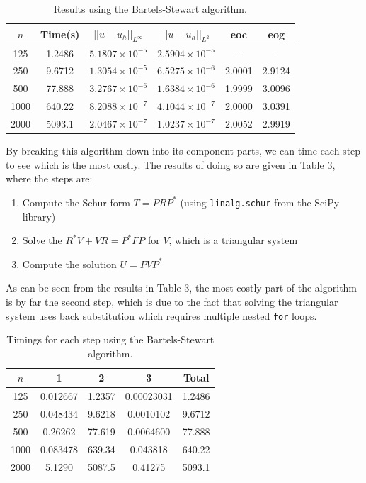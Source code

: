 \documentclass{article}
\numberwithin{equation}{section}
\begin{document}
\begin{table}[H]
\centering
\begin{tabular}{|c|c|c|c|c|c|}
\hline
$n$ & Time(s) & $|| u - u_h ||_{L^{\infty}}$ &$|| u - u_h ||_{L^{2}}$ & eoc & eog \\
\hline
125 & 1.2486 & $5.1807 \times 10^{-5}$ & $2.5904 \times 10^{-5}$ & - & - \\
250 & 9.6712 & $1.3054 \times 10^{-5}$ & $6.5275 \times 10^{-6}$ & 2.0001 & 2.9124 \\
500 & 77.888 & $3.2767 \times 10^{-6}$ & $1.6384 \times 10^{-6}$ & 1.9999 & 3.0096 \\ 
1000 & 640.22 & $8.2088 \times 10^{-7}$ & $4.1044 \times 10^{-7}$ & 2.0000 & 3.0391 \\
2000 & 5093.1 & $2.0467 \times 10^{-7}$ & $1.0237 \times 10^{-7}$ & 2.0052 & 2.9919 \\
\hline
\end{tabular}
\caption{Results using the Bartels-Stewart algorithm.}
\end{table}

By breaking this algorithm down into its component parts, we can time each step to see which is the most costly. The results of doing so are given in Table 3, where the steps are:

\begin{enumerate}
\item Compute the Schur form $T=PRP^*$ (using \texttt{linalg.schur} from the SciPy library)
\item Solve the $R^*V + VR = P^*FP$ for $V$, which is a triangular system
\item Compute the solution $U=PVP^*$
\end{enumerate}

As can be seen from the results in Table 3, the most costly part of the algorithm is by far the second step, which is due to the fact that solving the triangular system uses back substitution which requires multiple nested \texttt{for} loops.

\begin{table}[H]
\centering
\begin{tabular}{|c|c|c|c|c|}
\hline
$n$ & 1 & 2 & 3 & Total \\
\hline
125 & 0.012667 & 1.2357 & 0.00023031 & 1.2486 \\
250 & 0.048434 & 9.6218 & 0.0010102 & 9.6712 \\
500 & 0.26262 & 77.619 & 0.0064600 & 77.888 \\ 
1000 & 0.083478 & 639.34 & 0.043818 & 640.22 \\
2000 & 5.1290 & 5087.5 & 0.41275 & 5093.1 \\
\hline
\end{tabular}
\caption{Timings for each step using the Bartels-Stewart algorithm.}
\end{table}
\end{document}
